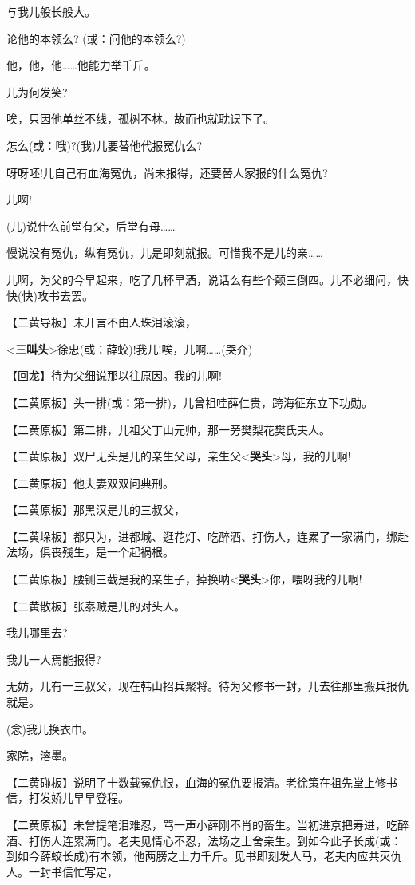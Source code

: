 与我儿般长般大。

论他的本领么? (或：问他的本领么?)

他，他，他\ldots{}\ldots{}他能力举千斤。

儿为何发笑?

唉，只因他单丝不线，孤树不林。故而也就耽误下了。

怎么(或：哦)?(我)儿要替他代报冤仇么?

呀呀呸!儿自己有血海冤仇，尚未报得，还要替人家报的什么冤仇?

儿啊!

(儿)说什么前堂有父，后堂有母\ldots{}\ldots{}

慢说没有冤仇，纵有冤仇，儿是即刻就报。可惜我不是儿的亲\ldots{}\ldots{}

儿啊，为父的今早起来，吃了几杯早酒，说话么有些个颠三倒四。儿不必细问，快快(快)攻书去罢。

【二黄导板】未开言不由人珠泪滚滚，

\textless{}\textbf{三叫头}\textgreater{}徐忠(或：薛蛟)!我儿!唉，儿啊\ldots{}\ldots{}(哭介)

【回龙】待为父细说那以往原因。我的儿啊!

【二黄原板】头一排(或：第一排)，儿曾祖哇薛仁贵，跨海征东立下功勋。

【二黄原板】第二排，儿祖父丁山元帅，那一旁樊梨花樊氏夫人。

【二黄原板】双尸无头是儿的亲生父母，亲生父\textless{}\textbf{哭头}\textgreater{}母，我的儿啊!

【二黄原板】他夫妻双双问典刑。

【二黄原板】那黑汉是儿的三叔父，

【二黄垛板】都只为，进都城、逛花灯、吃醉酒、打伤人，连累了一家满门，绑赴法场，俱丧残生，是一个起祸根。

【二黄原板】腰铡三截是我的亲生子，掉换呐\textless{}\textbf{哭头}\textgreater{}你，喂呀我的儿啊!

【二黄散板】张泰贼是儿的对头人。

我儿哪里去?

我儿一人焉能报得?

无妨，儿有一三叔父，现在韩山招兵聚将。待为父修书一封，儿去往那里搬兵报仇就是。

(念)我儿换衣巾。

家院，溶墨。

【二黄碰板】说明了十数载冤仇恨，血海的冤仇要报清。老徐策在祖先堂上修书信，打发娇儿早早登程。

【二黄原板】未曾提笔泪难忍，骂一声小薛刚不肖的畜生。当初进京把寿进，吃醉酒、打伤人连累满门。老夫见情心不忍，法场之上舍亲生。到如今此子长成(或：到如今薛蛟长成)有本领，他两膀之上力千斤。见书即刻发人马，老夫内应共灭仇人。一封书信忙写定，

